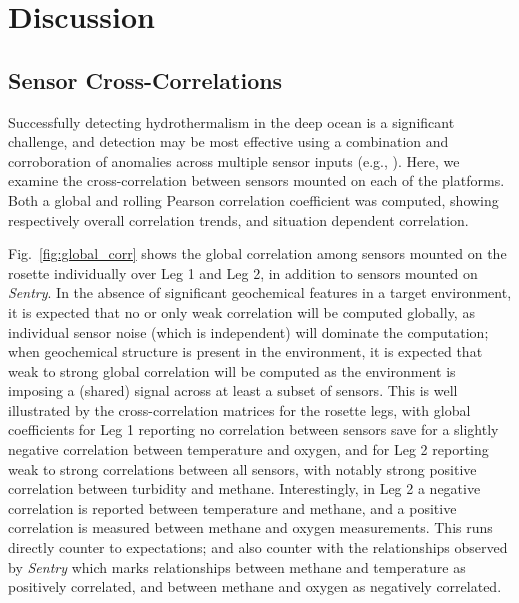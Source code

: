 \section{Discussion}

\subsection{Sensor Cross-Correlations}
\label{sec:correl}
Successfully detecting hydrothermalism in the deep ocean is a significant challenge, and detection may be most effective using a combination and corroboration of anomalies across multiple sensor inputs (e.g., \cite{jakuba2007stochastic}). Here, we examine the cross-correlation between sensors mounted on each of the platforms. Both a global and rolling Pearson correlation coefficient was computed, showing respectively overall correlation trends, and situation dependent correlation.

Fig.~\ref{fig:global_corr} shows the global correlation among sensors mounted on the rosette individually over Leg 1 and Leg 2, in addition to sensors mounted on \emph{Sentry}. In the absence of significant geochemical features in a target environment, it is expected that no or only weak correlation will be computed globally, as individual sensor noise (which is independent) will dominate the computation; when geochemical structure is present in the environment, it is expected that weak to strong global correlation will be computed as the environment is imposing a (shared) signal across at least a subset of sensors. This is well illustrated by the cross-correlation matrices for the rosette legs, with global coefficients for Leg 1 reporting no correlation between sensors save for a slightly negative correlation between temperature and oxygen, and for Leg 2 reporting weak to strong correlations between all sensors, with notably strong positive correlation between turbidity and methane. Interestingly, in Leg 2 a negative correlation is reported between temperature and methane, and a positive correlation is measured between methane and oxygen measurements. This runs directly counter to expectations; and also counter with the relationships observed by \emph{Sentry} which marks relationships between methane and temperature as positively correlated, and between methane and oxygen as negatively correlated. 

